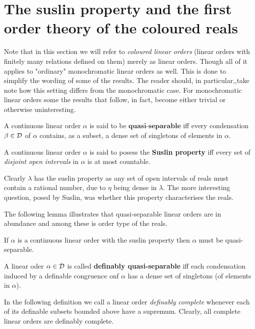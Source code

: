 \section{The  suslin property and the first order theory of the coloured reals}

Note that in this section we will refer to \textit{coloured linear orders} (linear orders with finitely many relations defined on them) merely as linear orders.  Though all of it applies to "ordinary" monochromatic linear orders as well.  This is done to simplify the wording of some of the results.  The reader should, in particular,,take note how this setting differs from the monochromatic case.  For monochromatic linear orders some the results that follow, in fact, become either trivial or otherwise uninteresting.

\begin{dfn}
	A continuous linear order $\alpha$ is said to be $\textbf{quasi-separable}$ iff every condensation $\beta\in\mathcal{D}$ of $\alpha$ contains, as a subset, a dense set of singletons of elements in $\alpha$.
\end{dfn}

\begin{dfn}
	A continuous linear order $\alpha$ is said to posess the \textbf{Suslin property} iff every set of \textit{disjoint open intervals} in $\alpha$ is at most countable.
\end{dfn}

Clearly $\lambda$ has the suslin property as any set of open intervals of reals must contain a rational number, due to $\eta$ being dense in $\lambda$.  The more interesting question, posed by Suslin, was whether this property characterises the reals.

The following lemma illustrates that quasi-separable linear orders are in abundance and among these is order type of the reals.

\begin{prp}
	If $\alpha$ is a continuous linear order with the suslin property then $\alpha$ must be quasi-separable.
\end{prp}

\begin{dfn}
	A linear oder $\alpha\in\mathcal{D}$ is called \textbf{definably quasi-separable} iff each condensation induced by a definable congruence onf $\alpha$ has a dense set of singletons (of elements in $\alpha$).
\end{dfn}
In the following definition we call a linear order \textit{definably complete} whenever each of its definable subsets bounded above have a supremum.  Clearly, all complete linear orders are definably complete.


